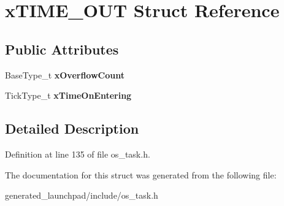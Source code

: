 \hypertarget{structxTIME__OUT}{}\section{x\+T\+I\+M\+E\+\_\+\+O\+UT Struct Reference}
\label{structxTIME__OUT}
\subsection*{Public Attributes}
\begin{DoxyCompactItemize}
\item 
\mbox{\label{structxTIME__OUT_a9289c6f97096a9b3e3fc705d0bc5a160}} 
Base\+Type\+\_\+t {\bfseries x\+Overflow\+Count}
\item 
\mbox{\label{structxTIME__OUT_a3464939ca050f7bcc6ffe0d8d3766337}} 
Tick\+Type\+\_\+t {\bfseries x\+Time\+On\+Entering}
\end{DoxyCompactItemize}


\subsection{Detailed Description}


Definition at line 135 of file os\+\_\+task.\+h.



The documentation for this struct was generated from the following file\+:\begin{DoxyCompactItemize}
\item 
generated\+\_\+launchpad/include/os\+\_\+task.\+h\end{DoxyCompactItemize}
